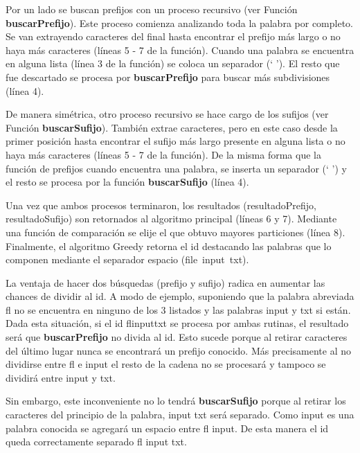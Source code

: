 \documentclass[a4paper,12pt]{report}
\begin{document}
Por un lado se buscan prefijos con un proceso recursivo (ver Función \mbox{\textbf{buscarPrefijo}}). Este proceso comienza analizando toda la palabra por completo. Se van extrayendo caracteres del final hasta encontrar el prefijo más largo o no haya más caracteres (líneas 5 - 7 de la función). %
Cuando una palabra se encuentra en alguna lista (línea 3 de la función) se coloca un separador (` '). El resto que fue descartado se procesa por \textbf{buscarPrefijo} para buscar más subdivisiones (línea 4).

De manera simétrica, otro proceso recursivo se hace cargo de los sufijos (ver Función \textbf{buscarSufijo}). También extrae caracteres, pero en este caso desde la primer posición hasta encontrar el sufijo más largo presente en alguna lista o no haya más caracteres (líneas 5 - 7 de la función). %
De la misma forma que la función de prefijos cuando encuentra una palabra, se inserta un separador (` ') y el resto se procesa por la función \textbf{buscarSufijo} (línea 4).

Una vez que ambos procesos terminaron, los resultados (\textsf{resultadoPrefijo, resultadoSufijo}) son retornados al algoritmo principal (líneas 6 y 7). Mediante una función de comparación se elije el que obtuvo mayores particiones (línea 8). Finalmente, el algoritmo Greedy retorna el id destacando las palabras que lo componen mediante el separador espacio \mbox{(\textsf{file input txt})}.

La ventaja de hacer dos búsquedas (prefijo y sufijo) radica en aumentar las chances de dividir al id. A modo de ejemplo, suponiendo que la palabra abreviada \textsf{fl}
no se encuentra en ninguno de los 3 listados y las palabras \textsf{input} y \textsf{txt} si están. Dada esta situación, si el id \textsf{flinputtxt} se procesa por ambas rutinas, el resultado será que \textbf{buscarPrefijo} no divida al id. Esto sucede porque al retirar caracteres del último lugar nunca se encontrará un prefijo conocido. Más precisamente al no dividirse entre \textsf{fl} e \textsf{input} el resto de la cadena no se procesará y tampoco se dividirá entre \textsf{input} y \textsf{txt}. 

Sin embargo, este inconveniente no lo tendrá \textbf{buscarSufijo} porque al retirar los caracteres del principio de la palabra, \textsf{input txt} será separado. Como \textsf{input} es una palabra conocida se agregará un espacio entre \textsf{fl input}. De esta manera el id queda correctamente separado \textsf{fl input txt}.\\
\end{document}
